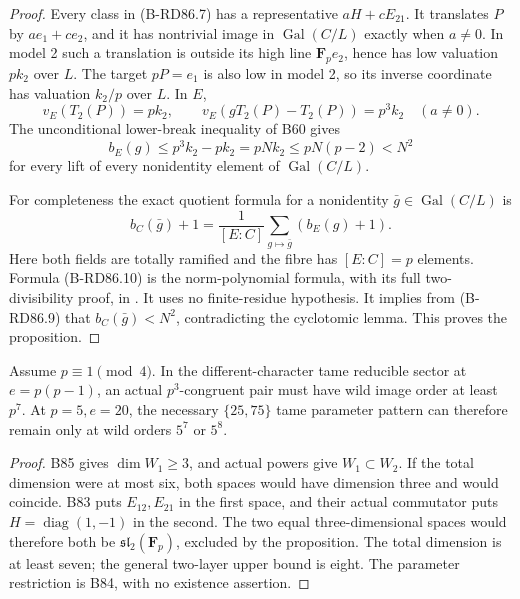 \begin{proof}
Every class in (B-RD86.7) has a representative
\(aH+cE_{21}\). It translates \(P\) by
\(ae_1+ce_2\), and it has nontrivial image in
\(\operatorname{Gal}(C/L)\) exactly when \(a\ne0\).
In model 2 such a translation is outside its high
line \(\mathbf F_pe_2\), hence has low valuation
\(pk_2\) over \(L\). The target \(pP=e_1\) is
also low in model 2, so its inverse coordinate has
valuation \(k_2/p\) over \(L\). In \(E\),
\[
       v_E(T_2(P))=pk_2,\qquad
       v_E(gT_2(P)-T_2(P))=p^3k_2\quad(a\ne0).
                                                        \tag{B-RD86.8}
\]
The unconditional lower-break inequality of B60 gives
\[
             b_E(g)\le p^3k_2-pk_2=pNk_2
                \le pN(p-2)<N^2                   \tag{B-RD86.9}
\]
for every lift of every nonidentity element of
\(\operatorname{Gal}(C/L)\).

For completeness the exact quotient formula for a
nonidentity \(\bar g\in\operatorname{Gal}(C/L)\) is
\[
 b_C(\bar g)+1
   =\frac1{[E:C]}\sum_{g\mapsto\bar g}(b_E(g)+1).
                                                        \tag{B-RD86.10}
\]
Here both fields are totally ramified and the fibre
has \([E:C]=p\) elements. Formula (B-RD86.10) is the
norm-polynomial formula, with its full two-divisibility
proof, in \cite[Proposition 3.7, pp.~14--15]{ColmezCorpsLocaux}.
It uses no finite-residue hypothesis. It implies from
(B-RD86.9) that \(b_C(\bar g)<N^2\), contradicting
the cyclotomic lemma. This proves the proposition.
\end{proof}

\begin{corollary}
\label{cor:B-RD86-tame}
Assume \(p\equiv1\pmod4\). In the different-character
tame reducible sector at \(e=p(p-1)\), an actual
\(p^3\)-congruent pair must have wild image order at
least \(p^7\). At \(p=5,e=20\), the necessary
\(\{25,75\}\) tame parameter pattern can therefore
remain only at wild orders \(5^7\) or \(5^8\).
\end{corollary}
\begin{proof}
B85 gives \(\dim W_1\ge3\), and actual powers give
\(W_1\subset W_2\). If the total dimension were at
most six, both spaces would have dimension three and
would coincide. B83 puts \(E_{12},E_{21}\) in the
first space, and their actual commutator puts
\(H=\operatorname{diag}(1,-1)\) in the second.
The two equal three-dimensional spaces would therefore
both be \(\mathfrak{sl}_2(\mathbf F_p)\), excluded by
the proposition. The total dimension is at least seven;
the general two-layer upper bound is eight.
The parameter restriction is B84, with no existence
assertion.
\end{proof}

